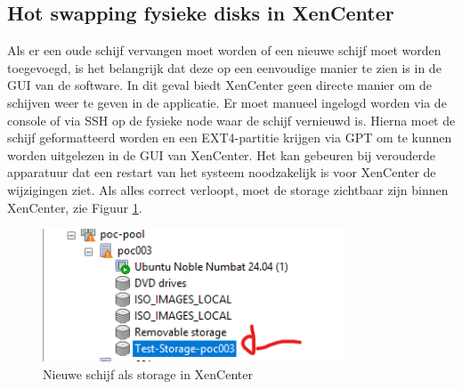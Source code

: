 \subsection{Hot swapping fysieke disks in XenCenter}%
Als er een oude schijf vervangen moet worden of een nieuwe schijf moet worden toegevoegd, is het belangrijk dat deze op een eenvoudige manier te zien is in de GUI van de software.
In dit geval biedt XenCenter geen directe manier om de schijven weer te geven in de applicatie. Er moet manueel ingelogd worden via de console of via SSH op de fysieke node waar de schijf vernieuwd is.
Hierna moet de schijf geformatteerd worden en een EXT4-partitie krijgen via GPT om te kunnen worden uitgelezen in de GUI van XenCenter.
Het kan gebeuren bij verouderde apparatuur dat een restart van het systeem noodzakelijk is voor XenCenter de wijzigingen ziet.
Als alles correct verloopt, moet de storage zichtbaar zijn binnen XenCenter, zie Figuur \ref{fig:swap-storage-xen}.
\begin{figure}[H]
\centering
\includegraphics[width=0.8\textwidth]{../poc/swap-storage-xen.png}
\caption{Nieuwe schijf als storage in XenCenter}
\label{fig:swap-storage-xen}
\end{figure}